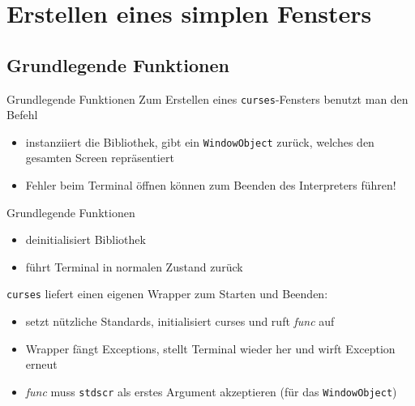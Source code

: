 \section{Erstellen eines simplen Fensters}

\subsection{Grundlegende Funktionen}

\begin{frame}{Grundlegende Funktionen}
	Zum Erstellen eines \texttt{curses}-Fensters benutzt man den Befehl
	
	
	
	\begin{itemize}
		\item instanziiert die Bibliothek, gibt ein \texttt{WindowObject} zurück, welches den gesamten Screen repräsentiert
		\item Fehler beim Terminal öffnen können zum Beenden des Interpreters führen!
	\end{itemize}
\end{frame}

\begin{frame}{Grundlegende Funktionen}
	
	
	\begin{itemize}
		\item deinitialisiert Bibliothek
		\item führt Terminal in normalen Zustand zurück
	\end{itemize}
\end{frame}

\begin{frame}
	\texttt{curses} liefert einen eigenen Wrapper zum Starten und Beenden:
	
	
	
	\begin{itemize}
		\item setzt nützliche Standards, initialisiert curses und ruft \emph{func} auf
		\item Wrapper fängt Exceptions, stellt Terminal wieder her und wirft Exception erneut
		\item \emph{func} muss \alert{\texttt{stdscr}} als erstes Argument akzeptieren (für das \texttt{WindowObject})
	\end{itemize}
\end{frame}



